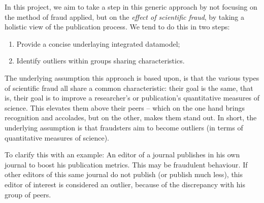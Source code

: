 \documentclass{ou-report}
\newcommand{\todo}[1]{{\color{red} TODO: #1}}
\begin{document}

In this project, we aim to take a step in this generic approach by not 
focusing on the method of fraud applied, but on the 
\emph{effect of scientific fraud}, by taking a holistic view of the publication 
process. We tend to do this in two steps:
\begin{enumerate}
\item Provide a concise underlaying integrated datamodel;
\item Identify outliers within groups sharing characteristics.
\end{enumerate}

The underlying assumption this approach is based upon, is that the various types 
of scientific fraud all 
share a common characteristic: their goal is the same, that is, their goal 
is to improve a researcher's or publication's quantitative measures of 
science. This elevates them above their peers -- which on the one hand 
brings recognition and accolades, but on the other, makes them stand out. In 
short, the underlying assumption is that fraudsters aim to become outliers 
(in terms of quantitative measures of science).

To clarify this with an example: An editor of a journal publishes in his 
own journal to boost his publication metrics. This may be fraudulent behaviour. 
If other editors of this same journal do not publish (or publish much less), 
this editor of interest is considered an outlier, because of the discrepancy 
with his group of peers. 
\end{document}
